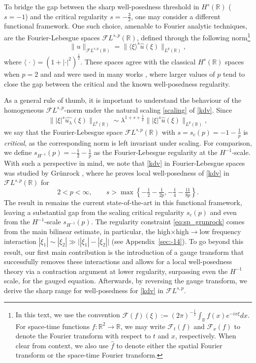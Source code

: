 \documentclass[a4paper,
11pt,  reqno]{amsart}
\newcommand{\5}{\textup{V}}
\newcommand{\FL}{\mathcal{F} L}
\newcommand{\ft}{\widehat}
\theoremstyle{remark}
\newcommand{\R}{\mathbb{R}}
\newcommand{\ld}{\lambda}
\newcommand{\Ft}{{\mathcal{F}}}
\newcommand{\jb}[1]
{\langle #1 \rangle}
\numberwithin{equation}{section}
\numberwithin{theorem}{section}
\begin{document}
To bridge the gap between the sharp well-posedness threshold in $H^s(\R)$ ($s=-1$) and the critical regularity $s=-\frac32$, one may consider a different functional framework.
One such choice, amenable to Fourier analytic techniques, are the Fourier-Lebesgue spaces $\FL^{s,p}(\R)$, defined through the following norm\footnote{
In this text, we use the convention
$
 \Ft(f)(\xi) := (2\pi)^{-\frac12} \int_\R f(x) e^{-i x \xi} dx.
$
For space-time functions $f: \R^2 \to \R$, we may write $\Ft_t (f)$ and $\Ft_x(f)$ to denote the Fourier transform with respect to $t$ and $x$, respectively. When clear from context, we also use $\ft{f}$ to denote either the spatial Fourier transform or the space-time Fourier transform. }
	\begin{equation}
		\|u \|_{\FL^{s,p}(\R)}=\|\jb{\xi}^{s}\ft{u  }(\xi)\|_{L^p(\R)},
	\end{equation}
    where $\jb{\,\cdot\,} = (1+|\cdot|^2)^\frac12$.
These spaces agree with the classical $H^s(\R)$ spaces when $p=2$ and
and were used in many works \cite{adams, BO94, Chapouto_FL_mkdv, Christ_power,CC24,Grunrock_mkdv, Grunrock_ldv_hier, HerrGrunrock_FL,  GrunrockVega}, where larger values of $p$ tend to close the gap between the critical and the known well-posedness regularity.





As a general rule of thumb, it is important to understand the behaviour of the homogeneous ${\FL}^{s,p}$-norm under the natural scaling \eqref{scaling} of \eqref{kdv}.
Since
$$
\big\| |\xi|^s  \ft{u_\ld}(\xi) \big\|_{L^p(\R)} \sim \lambda^{1+s+\frac1p}
\big\| |\xi|^s \ft{u} (\xi) \big\|_{L^p(\R)},
$$
we say that the Fourier-Lebesgue space $\FL^{s,p}(\R)$ with
$s=s_c(p)=-1-\frac1p$ is \emph{critical}, as the corresponding norm is left invariant under scaling. For comparison, we define $s_{H^{-1}}(p) = - \frac12 - \frac1p$ as the Fourier-Lebesgue regularity at the $H^{-1}$-scale.
 With such a perspective in mind, we note that \eqref{kdv} in Fourier-Lebesgue spaces was studied by Gr\"unrock \cite{Grunrock_ldv_hier},  where he proves local well-posedness of \eqref{kdv} in $\mathcal{F}L^{s,p}(\R)$ for
	\begin{equation}
		2<p<\infty,\qquad s>\max\left\{ -\tfrac12 - \tfrac{1}{2p}, -\tfrac14 - \tfrac{11}{8p} \right\}.
\label{eq:sp_grunrock}
	\end{equation}
The result in \cite{Grunrock_ldv_hier} remains the current state-of-the-art in this functional framework, leaving a substantial gap from the scaling critical regularity $s_c(p)$ and even from the $H^{-1}$-scale $s_{H^{-1}}(p)$. The regularity constraint \eqref{eq:sp_grunrock} comes from the main bilinear estimate, in particular, the high$\times$high$\to$low frequency interaction $|\xi_1| \sim |\xi_2| \gg \big||\xi_1| - |\xi_2|\big|$ (see Appendix~\ref{sec:-14}).
To go beyond this result, our first main contribution is the introduction of a gauge transform that
successfully removes these interactions and allows for a local well-posedness theory via a contraction argument at lower regularity, surpassing even the $H^{-1}$ scale, for the gauged equation. Afterwards, by reversing the gauge transform, we derive the sharp range for well-posedness for \eqref{kdv} in $\FL^{s,p}$.
\end{document}
